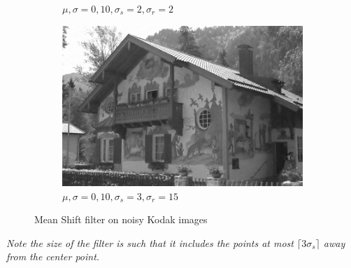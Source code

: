 \documentclass[a4paper, landscape]{article}
\begin{document}
\begin{figure}
\begin{subfigure}{0.33\linewidth}
        \caption{$\mu, \sigma = 0, 10, \sigma_s=2, \sigma_r=2$}
    \end{subfigure}
    \begin{subfigure}{0.33\linewidth}
        \centering
        \includegraphics[width=\linewidth]{kodak24,σ_noise10,σ_spatial3,σ_range15.png}
        \caption{$\mu, \sigma = 0, 10, \sigma_s=3, \sigma_r=15$}
    \end{subfigure}
    \caption{Mean Shift filter on noisy Kodak images}
    \label{fig:kn}
\end{figure}

{\it Note the size of the filter is such that it includes the points at most ${\lceil3\sigma_s\rceil}$ away from the center point.
}
\end{document}
